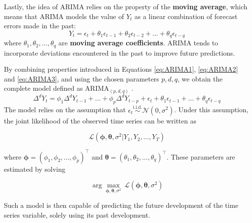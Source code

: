 Lastly, the idea of ARIMA relies on the property of the \textbf{moving average}, which means that ARIMA models
the value of $Y_t$ as a linear combination of forecast errors made in the past:
\begin{equation}
    \label{eq:ARIMA3}
    Y_t = \epsilon_t + \theta_1 \epsilon_{t-1} + \theta_2 \epsilon_{t-2} + \ldots + \theta_q \epsilon_{t-q}
\end{equation}
where $\theta_1, \theta_2, \ldots, \theta_q$ are \textbf{moving average coefficients}. ARIMA tends to incorporate deviations encountered in the past to improve future predictions.

By combining properties introduced in Equations \eqref{eq:ARIMA1}, \eqref{eq:ARIMA2} and \eqref{eq:ARIMA3}, and using the
chosen parameters $p, d, q$, we obtain the complete model defined as ARIMA$_{(p, d, q)}$ \cite{forecast_book}.
\begin{equation}
    \Delta^d Y_t = \phi_1 \Delta^d Y_{t-1} + \ldots + \phi_p \Delta^d Y_{t-p} + \epsilon_t + \theta_1 \epsilon_{t-1} + \ldots + \theta_q \epsilon_{t-q}
\end{equation}
The model relies on the assumption that $\epsilon_t \stackrel{\text{i.i.d.}}{\sim} \mathcal{N}(0, \sigma^2)$. Under this assumption, 
the joint likelihood of the observed time series can be written as

\begin{equation}
    \label{MLE}
    \mathcal{L}(\bm{\phi}, \bm{\theta}, \sigma^2 | Y_1, Y_2, \ldots, Y_T)
\end{equation}

where $\bm{\phi}=(\phi_1, \phi_2, \ldots, \phi_p)^\top$ and $\bm{\theta}=(\theta_1, \theta_2, \ldots, \theta_q)^\top$. These parameters are estimated by solving 

\begin{equation*}
    \arg \max_{\bm{\phi}, \bm{\theta}, \sigma^2} \> \mathcal{L}(\bm{\phi}, \bm{\theta}, \sigma^2)
\end{equation*}

Such a model is then capable of predicting the future development of the time series variable, solely using its past development.